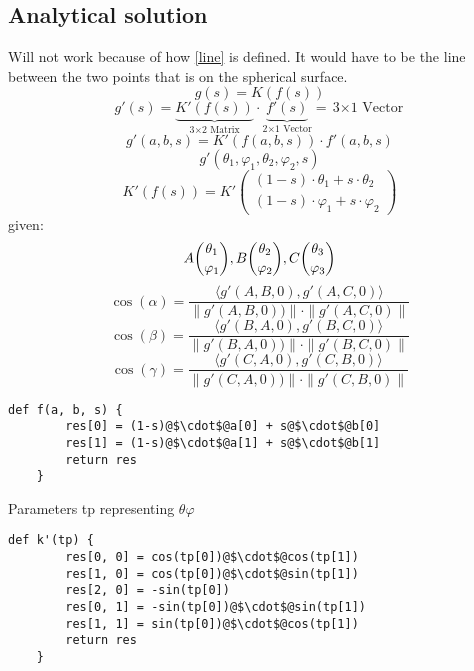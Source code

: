 \subsection{Analytical solution}
Will not work because of how \eqref{line} is defined. It would have to be the line between the two points that is on the spherical surface.
\begin{equation}
    g(s)=K(f(s))
\end{equation}
\begin{equation}
    g'(s) = \underbrace{K'(f(s))}_{\text{3$\times$2 Matrix}}\cdot\underbrace{f'(s)}_{\text{2$\times$1 Vector}}=\text{3$\times$1 Vector}
\end{equation}
\begin{equation}
    g'(a,b,s) = K'(f(a,b,s))\cdot f'(a,b,s)
\end{equation}
\begin{equation}
    g'(\theta_1,\varphi_1,\theta_2,\varphi_2,s)
\end{equation}
\begin{equation}
    K'(f(s))=K'
    \begin{pmatrix}
        (1-s)\cdot\theta_1 + s\cdot\theta_2 \\
        (1-s)\cdot\varphi_1 + s\cdot\varphi_2
    \end{pmatrix}
\end{equation}
given:
\begin{equation*}
    A\dbinom{\theta_1}{\varphi_1}, B\dbinom{\theta_2}{\varphi_2}, C\dbinom{\theta_3}{\varphi_3}
\end{equation*}
\begin{equation}
    \cos(\alpha)=\frac{\langle g'(A,B,0), g'(A,C,0)\rangle}{\|g'(A,B,0))\|\cdot \|g'(A,C,0)\|}
\end{equation}
\begin{equation}
    \cos(\beta)=\frac{\langle g'(B,A,0), g'(B,C,0)\rangle}{\|g'(B,A,0))\|\cdot \|g'(B,C,0)\|}
\end{equation}
\begin{equation}
    \cos(\gamma)=\frac{\langle g'(C,A,0), g'(C,B,0)\rangle}{\|g'(C,A,0))\|\cdot \|g'(C,B,0)\|}
\end{equation}
\begin{lstlisting}[escapechar=@]
    def f(a, b, s) {
        res[0] = (1-s)@$\cdot$@a[0] + s@$\cdot$@b[0]
        res[1] = (1-s)@$\cdot$@a[1] + s@$\cdot$@b[1]
        return res
    }
\end{lstlisting}
Parameters tp representing $\theta\varphi$
\begin{lstlisting}[escapechar=@]
    def k'(tp) {
        res[0, 0] = cos(tp[0])@$\cdot$@cos(tp[1])
        res[1, 0] = cos(tp[0])@$\cdot$@sin(tp[1])
        res[2, 0] = -sin(tp[0])
        res[0, 1] = -sin(tp[0])@$\cdot$@sin(tp[1])
        res[1, 1] = sin(tp[0])@$\cdot$@cos(tp[1])
        return res
    }
\end{lstlisting}
